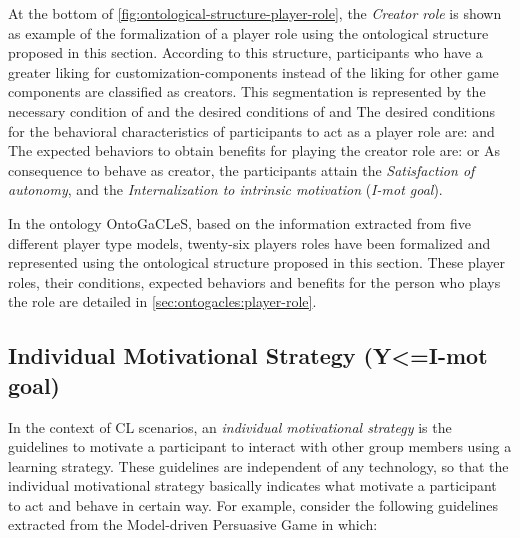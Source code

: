 At the bottom of \autoref{fig:ontological-structure-player-role}, the \emph{Creator role} is shown as example of the formalization of a player role using the ontological structure proposed in this section.
According to this structure, participants who have a greater liking for customization-components instead of the liking for other game components are classified as creators.
This segmentation is represented by the necessary condition of  and the desired conditions of     and 
The desired conditions for the behavioral characteristics of participants to act as a player role are:  and 
The expected behaviors to obtain benefits for playing the creator role are:
   
   or 
As consequence to behave as creator, the participants attain the \emph{Satisfaction of autonomy}, and the \emph{Internalization to intrinsic motivation} (\emph{I-mot goal}).

In the ontology OntoGaCLeS, based on the information extracted from five different player type models, twenty-six players roles have been formalized and represented using the ontological structure proposed in this section.
These player roles, their conditions, expected behaviors and benefits for the person who plays the role are detailed in \autoref{sec:ontogacles:player-role}.

\subsection{Individual Motivational Strategy (Y<=I-mot goal)}

In the context of CL scenarios, an \emph{individual motivational strategy} is the guidelines to motivate a participant to interact with other group members using a learning strategy.
These guidelines are independent of any technology, so that the individual motivational strategy basically indicates what motivate a participant to act and behave in certain way.
For example, consider the following guidelines extracted from the Model-driven Persuasive Game in which:

